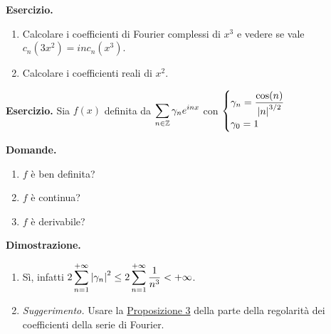\textbf{Esercizio.}
\begin{enumerate}

	\item Calcolare i coefficienti di Fourier complessi di $x^3$ e vedere se vale $c_n(3x^2) = i n c_n(x^3)$.


	\item Calcolare i coefficienti reali di $x^2$.

\end{enumerate}

\textbf{Esercizio.} Sia $f(x)$ definita da $\displaystyle \sum_{n \in \mathbb Z} \gamma_n e^{inx} $ con $\ds  %
\begin{cases}
	\ds \gamma_n = \frac{\cos(n)}{\left| n \right|^{3 / 2}} \\
	\gamma_0 = 1
\end{cases}
$

\textbf{Domande.}
\begin{enumerate}
\item $f$ è ben definita?

\item $f$ è continua?

\item $f$ è derivabile?
\end{enumerate}

\textbf{Dimostrazione.}
\begin{enumerate}

	\item Sì, infatti $\displaystyle 2 \sum_{n=1}^{+\infty} \left| \gamma_n \right|^2 \leq 2 \sum_{n=1}^{+\infty} \frac{1}{n^3} < +\infty $.


	\item \textit{Suggerimento.} Usare la \hyperlink{prop:2021-08nov_prop_3}{Proposizione 3} della parte della regolarità dei coefficienti della serie di Fourier.

\end{enumerate}
